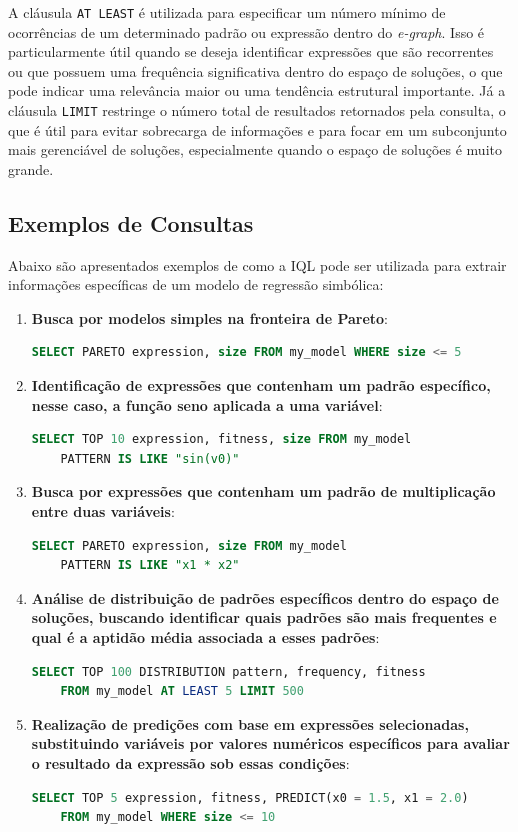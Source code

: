 A cláusula \texttt{AT LEAST} é utilizada para especificar um número mínimo de ocorrências de um determinado padrão ou expressão dentro do \textit{e-graph}. Isso é particularmente útil quando se deseja identificar expressões que são recorrentes ou que possuem uma frequência significativa dentro do espaço de soluções, o que pode indicar uma relevância maior ou uma tendência estrutural importante. Já a cláusula \texttt{LIMIT} restringe o número total de resultados retornados pela consulta, o que é útil para evitar sobrecarga de informações e para focar em um subconjunto mais gerenciável de soluções, especialmente quando o espaço de soluções é muito grande.

\subsection{Exemplos de Consultas}
Abaixo são apresentados exemplos de como a IQL pode ser utilizada para extrair informações específicas de um modelo de regressão simbólica:
\begin{enumerate}
    \item \textbf{Busca por modelos simples na fronteira de Pareto}:
    \begin{lstlisting}[language=SQL]
    SELECT PARETO expression, size FROM my_model WHERE size <= 5
    \end{lstlisting}

    \item \textbf{Identificação de expressões que contenham um padrão específico, nesse caso, a função seno aplicada a uma variável}:
    \begin{lstlisting}[language=SQL]
    SELECT TOP 10 expression, fitness, size FROM my_model
    PATTERN IS LIKE "sin(v0)"
    \end{lstlisting}

    \item \textbf{Busca por expressões que contenham um padrão de multiplicação entre duas variáveis}:
    \begin{lstlisting}[language=SQL]
    SELECT PARETO expression, size FROM my_model
    PATTERN IS LIKE "x1 * x2"
    \end{lstlisting}

    \item \textbf{Análise de distribuição de padrões específicos dentro do espaço de soluções, buscando identificar quais padrões são mais frequentes e qual é a aptidão média associada a esses padrões}:
    \begin{lstlisting}[language=SQL]
    SELECT TOP 100 DISTRIBUTION pattern, frequency, fitness
    FROM my_model AT LEAST 5 LIMIT 500
    \end{lstlisting}

    \item \textbf{Realização de predições com base em expressões selecionadas, substituindo variáveis por valores numéricos específicos para avaliar o resultado da expressão sob essas condições}:
    \begin{lstlisting}[language=SQL]
    SELECT TOP 5 expression, fitness, PREDICT(x0 = 1.5, x1 = 2.0)
    FROM my_model WHERE size <= 10
    \end{lstlisting}
\end{enumerate}

